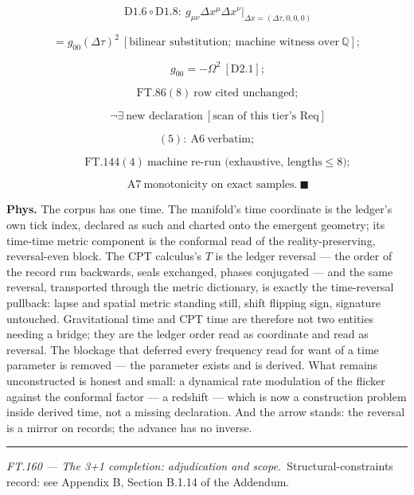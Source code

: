 \begin{theorem}
\[
\qquad \mathrm{D1.6}\circ\mathrm{D1.8}:\ g_{\mu\nu}\Delta x^\mu\Delta x^\nu\big|_{\Delta x=(\Delta\tau,0,0,0)}
\]

\[
= g_{00}(\Delta\tau)^2\ [\text{bilinear substitution};\ \text{machine witness over}\ \mathbb Q];
\]

\[
\qquad g_{00}=-\Omega^2\ [\mathrm{D2.1}];
\]

\[
\qquad \mathrm{FT.86}(8)\ \text{row cited unchanged};
\]

\[
\qquad \neg\exists\ \text{new declaration}\ [\text{scan of this tier's Req}]
\]

\[
(5):\ \mathrm{A6}\ \text{verbatim};
\]

\[
\qquad \mathrm{FT.144}(4)\ \text{machine re-run (exhaustive, lengths}\le8);
\]

\[
\qquad \mathrm{A7}\ \text{monotonicity on exact samples}.\ \blacksquare
\]

\textbf{Phys.} The corpus has one time. The manifold's time coordinate is the ledger's own tick index, declared as such and charted onto the emergent geometry; its time-time metric component is the conformal read of the reality-preserving, reversal-even block. The CPT calculus's $T$ is the ledger reversal — the order of the record run backwards, seals exchanged, phases conjugated — and the same reversal, transported through the metric dictionary, is exactly the time-reversal pullback: lapse and spatial metric standing still, shift flipping sign, signature untouched. Gravitational time and CPT time are therefore not two entities needing a bridge; they are the ledger order read as coordinate and read as reversal. The blockage that deferred every frequency read for want of a time parameter is removed — the parameter exists and is derived. What remains unconstructed is honest and small: a dynamical rate modulation of the flicker against the conformal factor — a redshift — which is now a construction problem inside derived time, not a missing declaration. And the arrow stands: the reversal is a mirror on records; the advance has no inverse.

\vspace{2pt}\noindent\rule{\textwidth}{0.4pt}\vspace{2pt}

\end{theorem}

\medskip\noindent\textit{\texorpdfstring{FT.160 — The 3+1 completion: adjudication and scope}{FT.160 - The 3+1 completion: adjudication and scope}.}\ Structural-constraints record: see Appendix B, Section B.1.14 of the Addendum.\par\medskip

